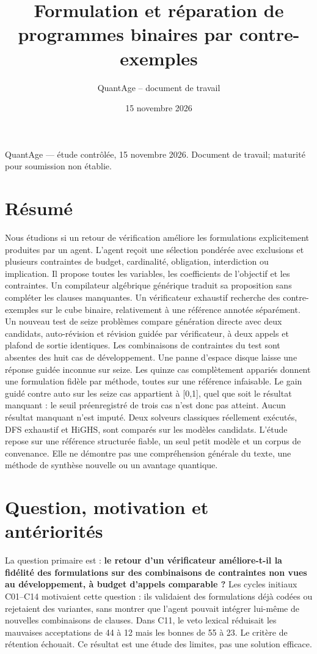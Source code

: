 \documentclass[11pt]{article}
\title{Formulation et réparation de programmes binaires par contre-exemples}
\author{QuantAge -- document de travail}
\date{15 novembre 2026}
\begin{document}
\maketitle

QuantAge — étude contrôlée, 15 novembre 2026. Document de travail; maturité pour soumission non établie.

\section{Résumé}

Nous étudions si un retour de vérification améliore les formulations explicitement produites par un agent. L'agent reçoit une sélection pondérée avec exclusions et plusieurs contraintes de budget, cardinalité, obligation, interdiction ou implication. Il propose toutes les variables, les coefficients de l'objectif et les contraintes. Un compilateur algébrique générique traduit sa proposition sans compléter les clauses manquantes. Un vérificateur exhaustif recherche des contre-exemples sur le cube binaire, relativement à une référence annotée séparément. Un nouveau test de seize problèmes compare génération directe avec deux candidats, auto-révision et révision guidée par vérificateur, à deux appels et plafond de sortie identiques. Les combinaisons de contraintes du test sont absentes des huit cas de développement. Une panne d'espace disque laisse une réponse guidée inconnue sur seize. Les quinze cas complètement appariés donnent une formulation fidèle par méthode, toutes sur une référence infaisable. Le gain guidé contre auto sur les seize cas appartient à [0,1], quel que soit le résultat manquant : le seuil préenregistré de trois cas n'est donc pas atteint. Aucun résultat manquant n'est imputé. Deux solveurs classiques réellement exécutés, DFS exhaustif et HiGHS, sont comparés sur les modèles candidats. L'étude repose sur une référence structurée fiable, un seul petit modèle et un corpus de convenance. Elle ne démontre pas une compréhension générale du texte, une méthode de synthèse nouvelle ou un avantage quantique.

\section{Question, motivation et antériorités}

La question primaire est : \textbf{le retour d'un vérificateur améliore-t-il la fidélité des formulations sur des combinaisons de contraintes non vues au développement, à budget d'appels comparable ?} Les cycles initiaux C01–C14 motivaient cette question : ils validaient des formulations déjà codées ou rejetaient des variantes, sans montrer que l'agent pouvait intégrer lui-même de nouvelles combinaisons de clauses. Dans C11, le veto lexical réduisait les mauvaises acceptations de 44 à 12 mais les bonnes de 55 à 23. Le critère de rétention échouait. Ce résultat est une étude des limites, pas une solution efficace.
\end{document}
